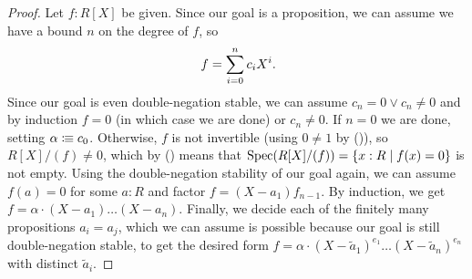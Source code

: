 \begin{proof}
  Let $f : R[X]$ be given.
  Since our goal is a proposition,
  we can assume we have a bound $n$ on the degree of $f$,
  so
  \[ f = \sum_{i = 0}^n c_i X^i \rlap{.} \]
  Since our goal is even double-negation stable,
  we can assume $c_n = 0 \lor c_n \neq 0$
  and by induction $f = 0$ (in which case we are done)
  or $c_n \neq 0$.
  If $n = 0$ we are done,
  setting $\alpha \vcentcolon\mspace{-1.2mu}\equiv c_0$.
  Otherwise,
  $f$ is not invertible (using $0 \neq 1$ by ()),
  so $R[X]/(f) \neq 0$,
  which by () means that
  $\operatorname{Spec}(R[X]/(f)) = \{ x : R \mid f(x) = 0 \}$
  is not empty.
  Using the double-negation stability of our goal again,
  we can assume $f(a) = 0$ for some $a : R$
  and factor $f = (X - a_1) f_{n - 1}$.
  By induction, we get $f = \alpha \cdot (X - a_1) \dots (X - a_n)$.
  Finally, we decide each of the finitely many propositions $a_i = a_j$,
  which we can assume is possible
  because our goal is still double-negation stable,
  to get the desired form
  $f = \alpha \cdot {(X - \widetilde{a}_1)}^{e_1} \dots {(X - \widetilde{a}_n)}^{e_n}$
  with distinct $\widetilde{a}_i$.
\end{proof}
